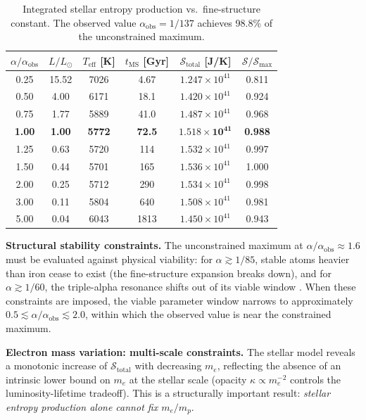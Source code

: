 \documentclass[12pt,a4paper]{article}
\theoremstyle{remark}
\begin{document}
\begin{table}[ht]
\centering
\caption{Integrated stellar entropy production vs.\ fine-structure constant. The observed value $\alpha_{\text{obs}} = 1/137$ achieves 98.8\% of the unconstrained maximum.}
\label{tab:alpha_scan}
\begin{tabular}{cccccc}
\toprule
$\alpha / \alpha_{\text{obs}}$ & $L / L_\odot$ & $T_{\text{eff}}$ [K] & $t_{\text{MS}}$ [Gyr] & $\mathcal{S}_{\text{total}}$ [J/K] & $\mathcal{S} / \mathcal{S}_{\text{max}}$ \\
\midrule
0.25 & 15.52 & 7026 & 4.67 & $1.247 \times 10^{41}$ & 0.811 \\
0.50 & 4.00 & 6171 & 18.1 & $1.420 \times 10^{41}$ & 0.924 \\
0.75 & 1.77 & 5889 & 41.0 & $1.487 \times 10^{41}$ & 0.968 \\
\textbf{1.00} & \textbf{1.00} & \textbf{5772} & \textbf{72.5} & $\mathbf{1.518 \times 10^{41}}$ & \textbf{0.988} \\
1.25 & 0.63 & 5720 & 114 & $1.532 \times 10^{41}$ & 0.997 \\
1.50 & 0.44 & 5701 & 165 & $1.536 \times 10^{41}$ & 1.000 \\
2.00 & 0.25 & 5712 & 290 & $1.534 \times 10^{41}$ & 0.998 \\
3.00 & 0.11 & 5804 & 640 & $1.508 \times 10^{41}$ & 0.981 \\
5.00 & 0.04 & 6043 & 1813 & $1.450 \times 10^{41}$ & 0.943 \\
\bottomrule
\end{tabular}
\end{table}

\textbf{Structural stability constraints.} The unconstrained maximum at $\alpha / \alpha_{\text{obs}} \approx 1.6$ must be evaluated against physical viability: for $\alpha \gtrsim 1/85$, stable atoms heavier than iron cease to exist (the fine-structure expansion breaks down), and for $\alpha \gtrsim 1/60$, the triple-alpha resonance shifts out of its viable window \citep{Adams2019}. When these constraints are imposed, the viable parameter window narrows to approximately $0.5 \lesssim \alpha/\alpha_{\text{obs}} \lesssim 2.0$, within which the observed value is near the constrained maximum.

\textbf{Electron mass variation: multi-scale constraints.} The stellar model reveals a monotonic increase of $\mathcal{S}_{\text{total}}$ with decreasing $m_e$, reflecting the absence of an intrinsic lower bound on $m_e$ at the stellar scale (opacity $\kappa \propto m_e^{-2}$ controls the luminosity-lifetime tradeoff). This is a structurally important result: \emph{stellar entropy production alone cannot fix $m_e/m_p$}.
\end{document}
